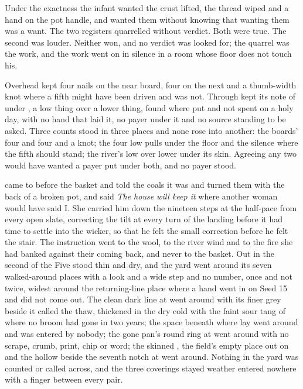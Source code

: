 Under the exactness the infant wanted the crust lifted, the thread wiped and a hand on the pot handle, and wanted them without knowing that wanting them was a want. The two registers quarrelled without verdict. Both were true. The second was louder. Neither won, and no verdict was looked for; the quarrel was the work, and the work went on in silence in a room whose floor does not touch his.

Overhead  kept four nails on the near board, four on the next and a thumb-width knot where a fifth might have been driven and was not. Through   kept its note of  under , a low thing over a lower thing, found where put and not spent on a holy day, with no hand that laid it, no payer under it and no source standing to be asked. Three counts stood in three places and none rose into another: the boards' four and four and a knot; the four low pulls under the floor and the silence where the fifth should stand; the river's low over lower under its skin. Agreeing any two would have wanted a payer put under both, and no payer stood.

 came to  before the basket and told the coals it was  and turned them with the back of a broken pot, and said \emph{The house will keep it} where another woman would have said I. She carried him down the nineteen steps at the half-pace from every open slate, correcting the tilt at every turn of the landing before it had time to settle into the wicker, so that he felt the small correction before he felt the stair. The instruction went to the wool, to the river wind and to the fire she had banked against their coming back, and never to the basket. Out in  the second of the Five stood thin and dry, and the yard went around its seven walked-around places with a look and a wide step and no number, once and not twice, widest around the returning-line place where a hand went in on Seed 15 and did not come out. The clean dark line at  went around with its finer grey beside it called the thaw, thickened in the dry cold with the faint sour tang of  where no broom had gone in two years; the space beneath  where  lay went around and was entered by nobody; the gone pan's round ring at  went around with no scrape, crumb, print, chip or word; the skinned , the field's empty place out on  and the hollow beside the seventh notch at  went around. Nothing in the yard was counted or called across, and the three coverings stayed weather entered nowhere with a finger between every pair.

